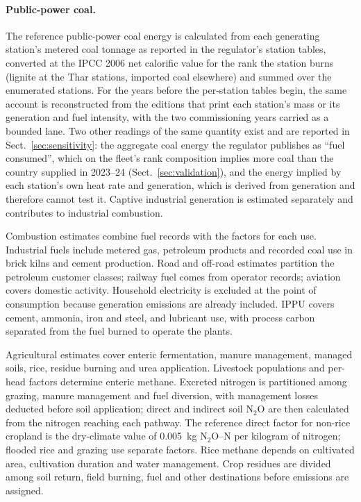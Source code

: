 \documentclass[essd,manuscript]{copernicus}
\begin{document}
\paragraph{Public-power coal.} The reference public-power coal energy is calculated from each generating station's metered coal tonnage as reported in the regulator's station tables, converted at the IPCC 2006 net calorific value for the rank the station burns (lignite at the Thar stations, imported coal elsewhere) and summed over the enumerated stations. For the years before the per-station tables begin, the same account is reconstructed from the editions that print each station's mass or its generation and fuel intensity, with the two commissioning years carried as a bounded lane. Two other readings of the same quantity exist and are reported in Sect.~\ref{sec:sensitivity}: the aggregate coal energy the regulator publishes as ``fuel consumed'', which on the fleet's rank composition implies more coal than the country supplied in 2023--24 (Sect.~\ref{sec:validation}), and the energy implied by each station's own heat rate and generation, which is derived from generation and therefore cannot test it. Captive industrial generation is estimated separately and contributes to industrial combustion.

Combustion estimates combine fuel records with the factors for each use. Industrial fuels include metered gas, petroleum products and recorded coal use in brick kilns and cement production. Road and off-road estimates partition the petroleum customer classes; railway fuel comes from operator records; aviation covers domestic activity. Household electricity is excluded at the point of consumption because generation emissions are already included. IPPU covers cement, ammonia, iron and steel, and lubricant use, with process carbon separated from the fuel burned to operate the plants.

Agricultural estimates cover enteric fermentation, manure management, managed soils, rice, residue burning and urea application. Livestock populations and per-head factors determine enteric methane. Excreted nitrogen is partitioned among grazing, manure management and fuel diversion, with management losses deducted before soil application; direct and indirect soil N$_2$O are then calculated from the nitrogen reaching each pathway. The reference direct factor for non-rice cropland is the dry-climate value of \num{0.005}~kg N$_2$O--N per kilogram of nitrogen; flooded rice and grazing use separate factors. Rice methane depends on cultivated area, cultivation duration and water management. Crop residues are divided among soil return, field burning, fuel and other destinations before emissions are assigned.
\end{document}

